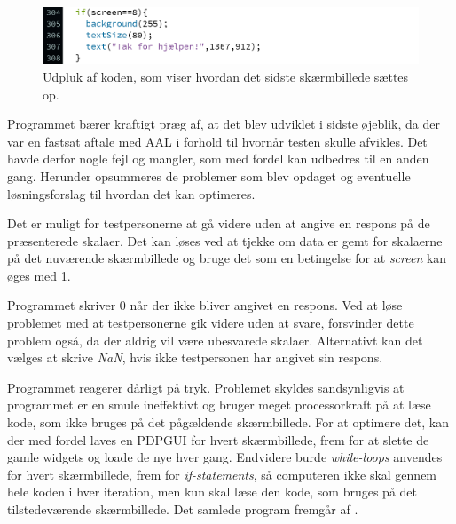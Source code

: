 %
\begin{figure}[H]
\centering
\includegraphics[width =\textwidth]{Figure/VASProgram/Tak} 
\caption{Udpluk af koden, som viser hvordan det sidste skærmbillede sættes op.}
\label{fig:Tak}
\end{figure}
\noindent
%
Programmet bærer kraftigt præg af, at det blev udviklet i sidste øjeblik, da der var en fastsat aftale med AAL i forhold til hvornår testen skulle afvikles. Det havde derfor nogle fejl og mangler, som med fordel kan udbedres til en anden gang. Herunder opsummeres de problemer som blev opdaget og eventuelle løsningsforslag til hvordan det kan optimeres. 

Det er muligt for testpersonerne at gå videre uden at angive en respons på de præsenterede skalaer. Det kan løses ved at tjekke om data er gemt for skalaerne på det nuværende skærmbillede og bruge det som en betingelse for at \textit{screen} kan øges med 1.

Programmet skriver 0 når der ikke bliver angivet en respons. Ved at løse problemet med at testpersonerne gik videre uden at svare, forsvinder dette problem også, da der aldrig vil være ubesvarede skalaer. Alternativt kan det vælges at skrive \textit{NaN}, hvis ikke testpersonen har angivet sin respons.

Programmet reagerer dårligt på tryk. Problemet skyldes sandsynligvis at programmet er en smule ineffektivt og bruger meget processorkraft på at læse kode, som ikke bruges på det pågældende skærmbillede. For at optimere det, kan der med fordel laves en PDPGUI for hvert skærmbillede, frem for at slette de gamle widgets og loade de nye hver gang. Endvidere burde \textit{while-loops} anvendes for hvert skærmbillede, frem for \textit{if-statements}, så computeren ikke skal gennem hele koden i hver iteration, men kun skal læse den kode, som bruges på det tilstedeværende skærmbillede.\blankline
%
Det samlede program fremgår af .
